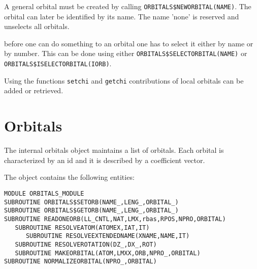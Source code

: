 \documentclass[11pt,a4paper]{report}
\begin{document}
A general orbital must be created by calling
\verb|ORBITALS$NEWORBITAL(NAME)|. The orbital can later be identified
by its name. The name 'none' is reserved and unselects all orbitals.

before one can do something to an orbital one has to select it either
by name or by number. This can be done using
either \verb|ORBITALS$SELECTORBITAL(NAME)| or
\verb|ORBITALS$ISELECTORBITAL(IORB)|.

Using the functions \verb|setchi| and \verb|getchi| contributions of
local orbitals can be added or retrieved.



\section{Orbitals}
The internal orbitals object maintains a list of orbitals. Each
orbital is characterized by an id and it is described by a coefficient
vector.

The object contains the following entities:
\begin{verbatim}
MODULE ORBITALS_MODULE
SUBROUTINE ORBITALS$SETORB(NAME_,LENG_,ORBITAL_)
SUBROUTINE ORBITALS$GETORB(NAME_,LENG_,ORBITAL_)
SUBROUTINE READONEORB(LL_CNTL,NAT,LMX,rbas,RPOS,NPRO,ORBITAL)
   SUBROUTINE RESOLVEATOM(ATOMEX,IAT,IT)
      SUBROUTINE RESOLVEEXTENDEDNAME(XNAME,NAME,IT)
   SUBROUTINE RESOLVEROTATION(DZ_,DX_,ROT)
   SUBROUTINE MAKEORBITAL(ATOM,LMXX,ORB,NPRO_,ORBITAL)
SUBROUTINE NORMALIZEORBITAL(NPRO_,ORBITAL)
\end{verbatim}


\end{document}
